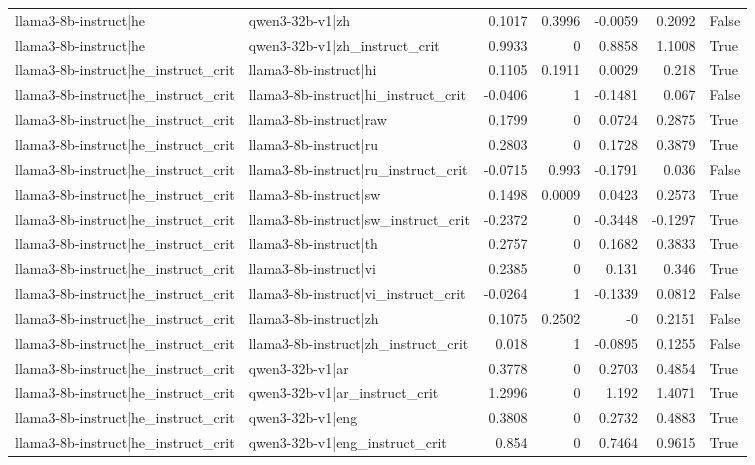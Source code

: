 \begin{table}
\begin{tabular}{l l r r r r l}
llama3-8b-instruct|he & qwen3-32b-v1|zh & 0.1017 & 0.3996 & -0.0059 & 0.2092 & False \\
llama3-8b-instruct|he & qwen3-32b-v1|zh_instruct_crit & 0.9933 & 0 & 0.8858 & 1.1008 & True \\
llama3-8b-instruct|he_instruct_crit & llama3-8b-instruct|hi & 0.1105 & 0.1911 & 0.0029 & 0.218 & True \\
llama3-8b-instruct|he_instruct_crit & llama3-8b-instruct|hi_instruct_crit & -0.0406 & 1 & -0.1481 & 0.067 & False \\
llama3-8b-instruct|he_instruct_crit & llama3-8b-instruct|raw & 0.1799 & 0 & 0.0724 & 0.2875 & True \\
llama3-8b-instruct|he_instruct_crit & llama3-8b-instruct|ru & 0.2803 & 0 & 0.1728 & 0.3879 & True \\
llama3-8b-instruct|he_instruct_crit & llama3-8b-instruct|ru_instruct_crit & -0.0715 & 0.993 & -0.1791 & 0.036 & False \\
llama3-8b-instruct|he_instruct_crit & llama3-8b-instruct|sw & 0.1498 & 0.0009 & 0.0423 & 0.2573 & True \\
llama3-8b-instruct|he_instruct_crit & llama3-8b-instruct|sw_instruct_crit & -0.2372 & 0 & -0.3448 & -0.1297 & True \\
llama3-8b-instruct|he_instruct_crit & llama3-8b-instruct|th & 0.2757 & 0 & 0.1682 & 0.3833 & True \\
llama3-8b-instruct|he_instruct_crit & llama3-8b-instruct|vi & 0.2385 & 0 & 0.131 & 0.346 & True \\
llama3-8b-instruct|he_instruct_crit & llama3-8b-instruct|vi_instruct_crit & -0.0264 & 1 & -0.1339 & 0.0812 & False \\
llama3-8b-instruct|he_instruct_crit & llama3-8b-instruct|zh & 0.1075 & 0.2502 & -0 & 0.2151 & False \\
llama3-8b-instruct|he_instruct_crit & llama3-8b-instruct|zh_instruct_crit & 0.018 & 1 & -0.0895 & 0.1255 & False \\
llama3-8b-instruct|he_instruct_crit & qwen3-32b-v1|ar & 0.3778 & 0 & 0.2703 & 0.4854 & True \\
llama3-8b-instruct|he_instruct_crit & qwen3-32b-v1|ar_instruct_crit & 1.2996 & 0 & 1.192 & 1.4071 & True \\
llama3-8b-instruct|he_instruct_crit & qwen3-32b-v1|eng & 0.3808 & 0 & 0.2732 & 0.4883 & True \\
llama3-8b-instruct|he_instruct_crit & qwen3-32b-v1|eng_instruct_crit & 0.854 & 0 & 0.7464 & 0.9615 & True \\

\end{tabular}
\end{table}
